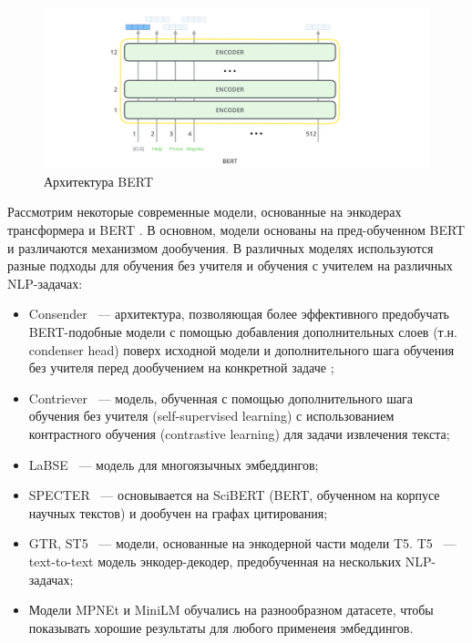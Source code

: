 \begin{figure}[h]
    \centering
    \includegraphics[width=\linewidth]{images/bert-architecture.png}
    \caption{Архитектура BERT}
    \label{img:bert-architecture}
\end{figure}

Рассмотрим некоторые современные модели, основанные на энкодерах трансформера и BERT \cite{mteb}. В основном, модели основаны на пред-обученном BERT и различаются механизмом дообучения. В различных моделях используются разные подходы для обучения без учителя и обучения с учителем на различных NLP-задачах:

\begin{itemize}
    \item Consender ~--- архитектура, позволяющая более эффективного предобучать BERT-подобные модели с помощью добавления дополнительных слоев (т.н. condenser head) поверх исходной модели и дополнительного шага обучения без учителя перед дообучением на конкретной задаче \cite{condenser};
    \item Contriever ~--- модель, обученная с помощью дополнительного шага обучения без учителя (self-supervised learning) с использованием контрастного обучения (contrastive learning) для задачи извлечения текста;
    \item LaBSE ~--- модель для многоязычных эмбеддингов;
    \item SPECTER ~--- основывается на SciBERT (BERT, обученном на корпусе научных текстов) и дообучен на графах цитирования;
    \item GTR, ST5 ~--- модели, основанные на энкодерной части модели T5. T5 ~--- text-to-text модель энкодер-декодер, предобученная на нескольких NLP-задачах;
    \item Модели MPNEt и MiniLM обучались на разнообразном датасете, чтобы показывать хорошие результаты для любого применеия эмбеддингов.
\end{itemize}


